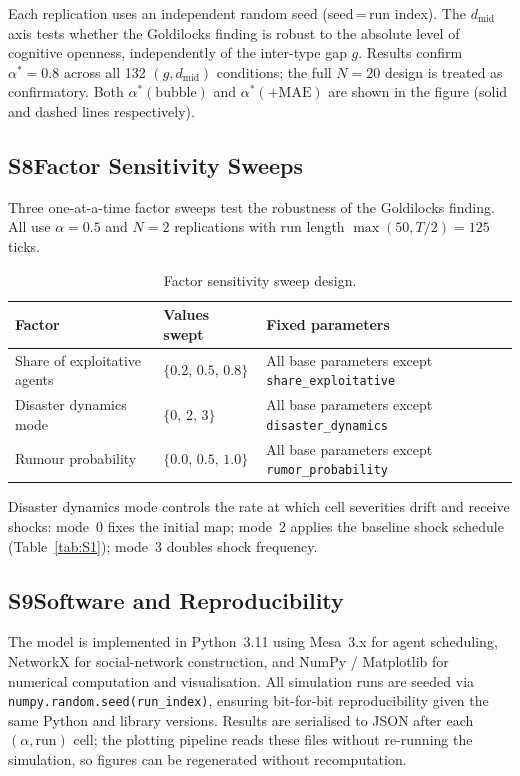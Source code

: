 Each replication uses an independent random seed (seed\,=\,run index).
The $d_{\mathrm{mid}}$ axis tests whether the Goldilocks finding is robust to
the absolute level of cognitive openness, independently of the inter-type gap $g$.
Results confirm $\alpha^*=0.8$ across all 132 $(g,d_{\mathrm{mid}})$ conditions;
the full $N=20$ design is treated as confirmatory.
Both $\alpha^*(\text{bubble})$ and $\alpha^*(+\mathrm{MAE})$ are shown in the
figure (solid and dashed lines respectively).

\subsection*{S8\quad Factor Sensitivity Sweeps}

Three one-at-a-time factor sweeps test the robustness of the Goldilocks finding.
All use $\alpha=0.5$ and $N=2$ replications with run length
$\max(50,T/2)=125$ ticks.

\begin{table}[h]
\centering
\caption{Factor sensitivity sweep design.}
\label{tab:S8}
\begin{tabular}{lll}
\toprule
Factor & Values swept & Fixed parameters \\
\midrule
Share of exploitative agents & $\{0.2,\,0.5,\,0.8\}$
  & All base parameters except \texttt{share\_exploitative} \\
Disaster dynamics mode & $\{0,\,2,\,3\}$
  & All base parameters except \texttt{disaster\_dynamics} \\
Rumour probability & $\{0.0,\,0.5,\,1.0\}$
  & All base parameters except \texttt{rumor\_probability} \\
\bottomrule
\end{tabular}
\end{table}

Disaster dynamics mode controls the rate at which cell severities drift and
receive shocks: mode~0 fixes the initial map; mode~2 applies the baseline shock
schedule (Table~\ref{tab:S1}); mode~3 doubles shock frequency.

\subsection*{S9\quad Software and Reproducibility}

The model is implemented in Python~3.11 using Mesa~3.x for agent scheduling,
NetworkX for social-network construction, and NumPy / Matplotlib for numerical
computation and visualisation.
All simulation runs are seeded via \texttt{numpy.random.seed(run\_index)},
ensuring bit-for-bit reproducibility given the same Python and library versions.
Results are serialised to JSON after each $(\alpha,\mathrm{run})$ cell; the
plotting pipeline reads these files without re-running the simulation, so figures
can be regenerated without recomputation.

